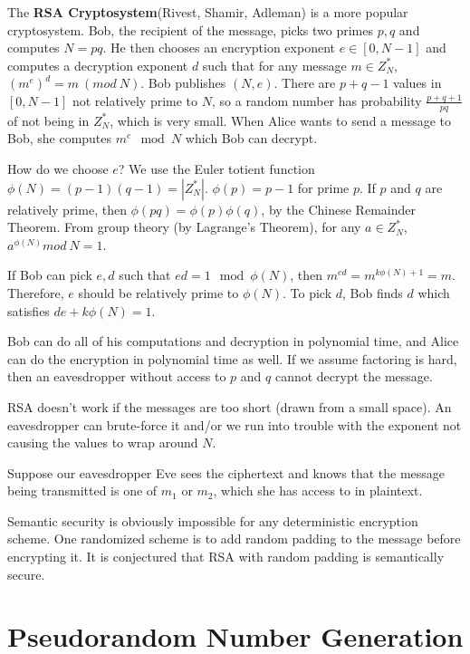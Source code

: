 The \textbf{RSA Cryptosystem}(Rivest, Shamir, Adleman) is a more popular cryptosystem.  Bob, the recipient of the message, picks two primes $p,q$ and computes $N=pq$.  He then chooses an encryption exponent $e\in [0,N-1]$ and computes a decryption exponent $d$ such that for any message $m\in Z_N^*$, $(m^e)^d=m\ (mod\  N)$.  Bob publishes $(N,e)$.  There are $p+q-1$ values in $[0,N-1]$ not relatively prime to $N$, so a random number has probability $\frac{p+q+1}{pq}$ of not being in $Z_N^*$, which is very small.  When Alice wants to send a message to Bob, she computes $m^e\mod N$ which Bob can decrypt.

How do we choose $e$?  We use the Euler totient function $\phi(N)=(p-1)(q-1)=|Z_N^*|$.  $\phi(p)=p-1$ for prime $p$.  If $p$ and $q$ are relatively prime, then $\phi(pq)=\phi(p)\phi(q)$, by the Chinese Remainder Theorem.  From group theory (by Lagrange's Theorem), for any $a\in Z_N^*$, $a^{\phi(N)}mod\  N=1$.

If Bob can pick $e,d$ such that $ed=1\mod \phi(N)$, then $m^{ed}=m^{k\phi(N)+1}=m$.  Therefore, $e$ should be relatively prime to $\phi(N)$.  To pick $d$, Bob finds $d$ which satisfies $de+k\phi(N)=1$.  

Bob can do all of his computations and decryption in polynomial time, and Alice can do the encryption in polynomial time as well.  If we assume factoring is hard, then an eavesdropper without access to $p$ and $q$ cannot decrypt the message.

RSA doesn't work if the messages are too short (drawn from a small space).  An eavesdropper can brute-force it and/or we run into trouble with the exponent not causing the values to wrap around $N$.

Suppose our eavesdropper Eve sees the ciphertext and knows that the message being transmitted is one of $m_1$ or $m_2$, which she has access to in plaintext.

Semantic security is obviously impossible for any deterministic encryption scheme.  One randomized scheme is to add random padding to the message before encrypting it.  It is conjectured that RSA with random padding is semantically secure.

\section*{Pseudorandom Number Generation}

